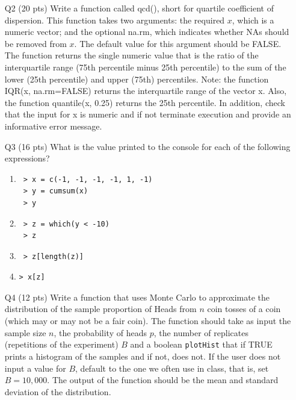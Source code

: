 \documentclass[12pt]{article}
\theoremstyle{Conjecture}
\theoremstyle{example}
\theoremstyle{remark}
\theoremstyle{lemma}
\theoremstyle{definition}
\theoremstyle{corol}
\theoremstyle{proposition}
\theoremstyle{condition}
\begin{document}
\begin{enumerate}
\newpage

\item[Q2] (20 pts) Write a function called qcd(), short for quartile
  coefficient of dispersion. This function takes two arguments: the
  required $x$, which is a numeric vector; and the optional na.rm,
  which indicates whether NAs should be removed from $x$. The default
  value for this argument should be FALSE. The function returns the
  single numeric value that is the ratio of the interquartile range
  (75th percentile minus 25th percentile) to the sum of the lower (25th
  percentile) and upper (75th) percentiles. Note: the function IQR(x,
  na.rm=FALSE) returns the interquartile range of the vector x. Also,
  the function quantile(x, 0.25) returns the 25th percentile. In
  addition, check that the input for x is numeric and if not terminate
  execution and provide an informative error message.

\newpage
\item[Q3] (16 pts) What is the value printed to the console for each
  of the following expressions?
\begin{enumerate}
\item 
\begin{verbatim}
 > x = c(-1, -1, -1, -1, 1, -1) 
 > y = cumsum(x) 
 > y 
\end{verbatim}
\vspace{1.5in}
\item 
\begin{verbatim}
 > z = which(y < -10) 
 > z
\end{verbatim}
\vspace{1.5in}
\item 
\begin{verbatim}
 > z[length(z)]
\end{verbatim}
\vspace{1.5in}
\item 
\begin{verbatim}
> x[z]
\end{verbatim}
\vspace{1.5in}
\end{enumerate}

\newpage

\item[Q4] (12 pts) Write a function that uses Monte Carlo to
  approximate the distribution of the sample proportion of Heads from
  $n$ coin tosses of a coin (which may or may not be a fair coin). The
  function should take as input the sample size $n$, the probability
  of heads $p$, the number of replicates (repetitions of the experiment)
  $B$ and a boolean {\tt plotHist} that if TRUE prints a histogram of
  the samples and if not, does not. If the user does not input a value
  for $B$, default to the one we often use in class, that is, set
  $B=10,000$. The output of the function should be the mean and
  standard deviation of the distribution.


\end{enumerate}
\end{document}
